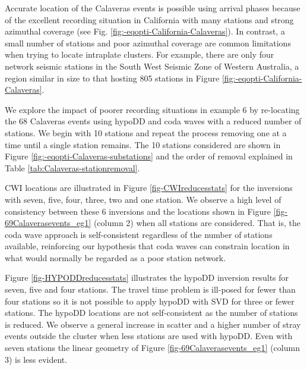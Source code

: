 \documentclass[extra, onecolumn, doublespacing]{gji}
\begin{document}
Accurate location of the Calaveras events is possible using arrival
phases because of the excellent recording situation in California
with many stations and strong azimuthal coverage (see Fig.
\ref{fig:-eqopti-California-Calaveras}). In contrast, a small number
of stations and poor azimuthal coverage are common limitations when
trying to locate intraplate clusters. For example, there are only
four network seismic stations in the South West Seismic Zone of
Western Australia, a region similar in size to that hosting 805
stations in Figure \ref{fig:-eqopti-California-Calaveras}.

We explore the impact of poorer recording situations in example 6 by
re-locating the 68 Calaveras events  using hypoDD and coda waves
with a reduced number of stations. We begin with 10 stations and
repeat the process removing one at a time until a single station
remains. The 10 stations considered are shown in Figure
\ref{fig:-eqopti-Calaveras-substations} and the order of removal
explained in Table \ref{tab:Calaveras-stationremoval}.

CWI locations are illustrated in Figure \ref{fig-CWIreducesstats}
for the inversions with seven, five, four, three, two and one
station. We observe a high level of consistency between these 6
inversions and the locations shown in Figure
\ref{fig-69Calaverasevents_eg1} (column 2) when all stations are
considered. That is, the coda wave approach is self-consistent
regardless of the number of stations available, reinforcing our
hypothesis that coda waves can constrain location in what would
normally be regarded as a poor station network.


Figure \ref{fig-HYPODDreducesstats} illustrates the hypoDD inversion
results for seven, five and four stations. The travel time problem
is ill-posed for fewer than four stations so it is not possible to
apply hypoDD with SVD for three or fewer stations.  The hypoDD
locations are not self-consistent as the number of stations is
reduced. We observe a general increase in scatter and a higher
number of stray events outside the cluster when less stations are
used with hypoDD. Even with seven stations the linear geometry of
Figure \ref{fig-69Calaverasevents_eg1} (column 3) is less evident.
\end{document}
